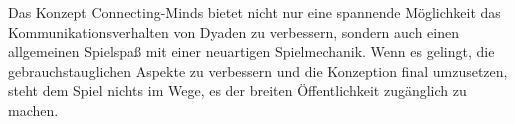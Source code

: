 Das Konzept Connecting-Minds bietet nicht nur eine spannende Möglichkeit das Kommunikationsverhalten von Dyaden zu verbessern, sondern auch einen allgemeinen Spielspaß mit einer neuartigen Spielmechanik. Wenn es gelingt, die gebrauchstauglichen Aspekte zu verbessern und die Konzeption final umzusetzen, steht dem Spiel nichts im Wege, es der breiten Öffentlichkeit zugänglich zu machen.